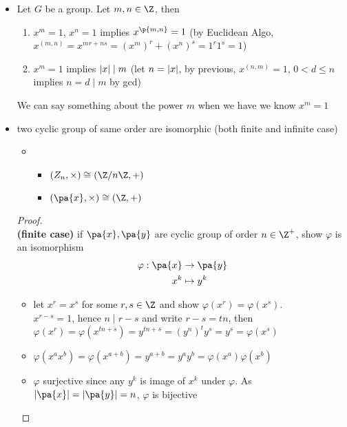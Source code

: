 \documentclass[11pt]{article}
\begin{document}
\begin{definition*}
\begin{itemize}
\begin{enumerate}
        \end{enumerate}
        \item {} Let $G$ be a group. Let $m,n\in\Z$, then
        \begin{enumerate}
            \item $x^m=1$, $x^n=1$ implies $x^{\p{m,n}}=1$ (by Euclidean Algo, $x^{(m,n)} = x^{mr+ns} = (x^m)^r + (x^n)^s = 1^r1^s=1$)
            \item $x^m=1$ implies $\left|x\right| \mid m$ (let $n=\left|x\right|$, by previous, $x^{(n, m)}=1$, $0<d\leq n$ implies $n = d\mid m$ by gcd)
        \end{enumerate}
        We can say something about the power $m$ when we have we know $x^m=1$
        \item {} two cyclic group of same order are isomorphic (both finite and infinite case)
        \begin{itemize}
            \item {}
            \begin{itemize}
                \item $(Z_n, \times) \cong (\integermodn, +)$
                \item $(\pa{x}, \times) \cong (\Z, +)$
            \end{itemize}
        \end{itemize}
        \begin{proof}
            $ $ \\
            \textbf{(finite case)} if $\pa{x}, \pa{y}$ are cyclic group of order $n\in\Z^+$, show $\varphi$ is an isomorphism
            \begin{align*}
                \varphi: \pa{x} &\to \pa{y} \\
                              x^k &\mapsto y^k
            \end{align*}
            \begin{itemize}
                \item {} let $x^r = x^s$ for some $r,s\in\Z$ and show $\varphi(x^r)=\varphi(x^s)$. \\
                $x^{r-s}=1$, hence $n \mid r-s$ and write $r-s = tn$, then $\varphi(x^r) = \varphi(x^{tn+s}) = y^{tn+s} = (y^n)^t y^s = y^s = \varphi(x^s)$
                \item {} $\varphi(x^ax^b) = \varphi(x^{a+b}) = y^{a+b} = y^ay^b = \varphi(x^a)\varphi(x^b)$
                \item {} $\varphi$ surjective since any $y^k$ is image of $x^k$ under $\varphi$. As $\order{\pa{x}} = \order{\pa{y}} = n$, $\varphi$ is bijective

\end{itemize}
\end{proof}
\end{itemize}
\end{definition*}
\end{document}
